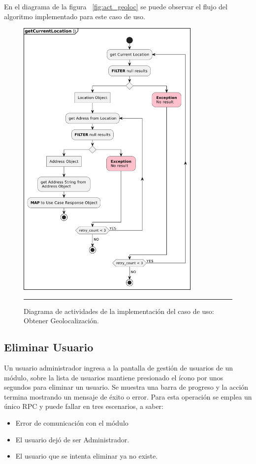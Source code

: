 En el diagrama de la figura ~\ref{fig:act_geoloc} se puede observar el flujo del algoritmo implementado para este caso de uso.

\begin{figure}[htbp]
	\centering
	\includegraphics[width=0.8\textwidth]{Figures/iter2/ACT_geoloc.png}
	\rule{35em}{1pt}
	\caption[Class Diagram]{Diagrama de actividades de la implementación del caso de uso: Obtener Geolocalización.}
	\label{fig:act_act_geoloc}
\end{figure}

\subsection{Eliminar Usuario}
Un usuario administrador ingresa a la pantalla de gestión de usuarios de un módulo, sobre la lista de usuarios mantiene presionado el ícono por unos segundos para eliminar un usuario. Se muestra una barra de progreso y la acción termina mostrando un mensaje de éxito o error.
Para esta operación se emplea un único RPC y puede fallar en tres escenarios, a saber:
\begin{itemize}
	\item Error de comunicación con el módulo
	\item El usuario dejó de ser Administrador.
	\item El usuario que se intenta eliminar ya no existe.
\end{itemize}

